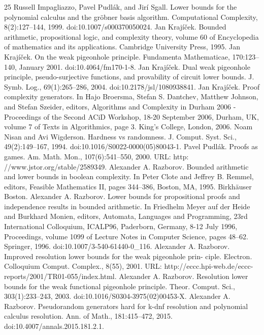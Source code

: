 \begin{thebibliography}{25}
 Russell Impagliazzo, Pavel Pudlák, and Jirí Sgall. Lower bounds for the polynomial calculus and the gröbner basis algorithm. Computational Complexity, 8(2):127–144, 1999. doi:10.1007/s000370050024.
 Jan Krajíček. Bounded arithmetic, propositional logic, and complexity theory, volume 60 of Encyclopedia of mathematics and its applications. Cambridge University Press, 1995.
 Jan Krajíček. On the weak pigeonhole principle. Fundamenta Mathematicae, 170:123–140, January 2001. doi:10.4064/fm170-1-8.
 Jan Krajíček. Dual weak pigeonhole principle, pseudo-surjective functions, and provability of circuit lower bounds. J. Symb. Log., 69(1):265–286, 2004. doi:10.2178/jsl/1080938841.
 Jan Krajíček. Proof complexity generators. In Hajo Broersma, Stefan S. Dantchev, Matthew Johnson, and Stefan Szeider, editors, Algorithms and Complexity in Durham 2006 - Proceedings of the Second ACiD Workshop, 18-20 September 2006, Durham, UK, volume 7 of Texts in Algorithmics, page 3. King’s College, London, 2006.
 Noam Nisan and Avi Wigderson. Hardness vs randomness. J. Comput. Syst. Sci., 49(2):149–167, 1994. doi:10.1016/S0022-0000(05)80043-1.
 Pavel Pudlák. Proofs as games. Am. Math. Mon., 107(6):541–550, 2000. URL: http: //www.jstor.org/stable/2589349.
 Alexander A. Razborov. Bounded arithmetic and lower bounds in boolean complexity. In Peter Clote and Jeffrey B. Remmel, editors, Feasible Mathematics II, pages 344–386, Boston, MA, 1995. Birkhäuser Boston.
 Alexander A. Razborov. Lower bounds for propositional proofs and independence results in bounded arithmetic. In Friedhelm Meyer auf der Heide and Burkhard Monien, editors, Automata, Languages and Programming, 23rd International Colloquium, ICALP96, Paderborn, Germany, 8-12 July 1996, Proceedings, volume 1099 of Lecture Notes in Computer Science, pages 48–62. Springer, 1996. doi:10.1007/3-540-61440-0\_116.
 Alexander A. Razborov. Improved resolution lower bounds for the weak pigeonhole prin- ciple. Electron. Colloquium Comput. Complex., 8(55), 2001. URL: http://eccc.hpi-web.de/eccc-reports/2001/TR01-055/index.html.
 Alexander A. Razborov. Resolution lower bounds for the weak functional pigeonhole principle. Theor. Comput. Sci., 303(1):233–243, 2003. doi:10.1016/S0304-3975(02)00453-X.
 Alexander A. Razborov. Pseudorandom generators hard for k-dnf resolution and polynomial calculus resolution. Ann. of Math., 181:415–472, 2015. doi:10.4007/annals.2015.181.2.1.

\end{thebibliography}
